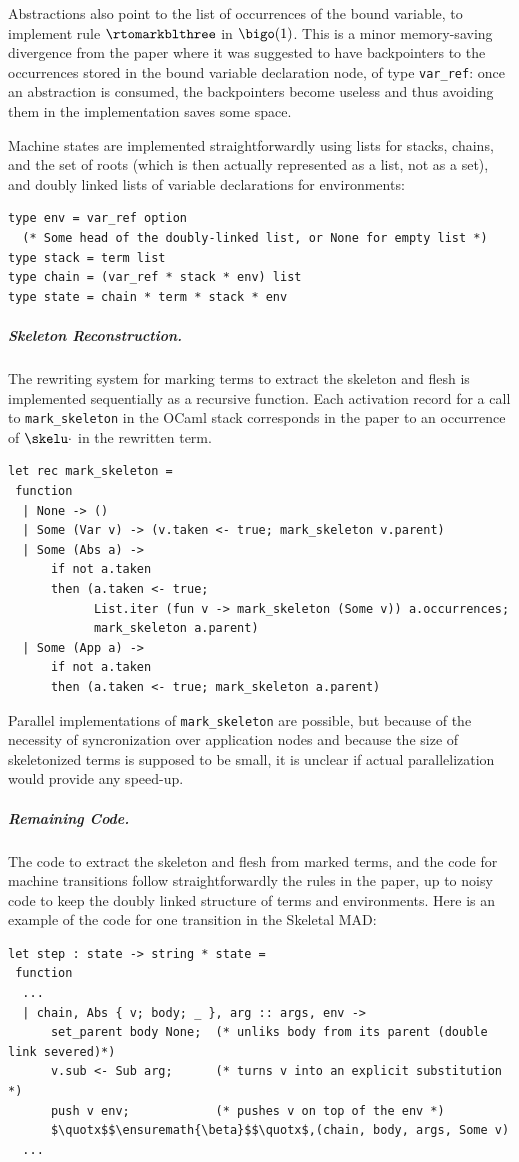 Abstractions also point to the list of occurrences of the bound variable, to implement rule $\rtomarkblthree$ in $\bigo(1)$. This is a minor memory-saving divergence from the paper where it was suggested to have backpointers to the occurrences stored in the bound variable declaration node, of type \lstinline{var_ref}: once an abstraction is consumed, the backpointers become useless and thus avoiding them in the implementation saves some space.

Machine states are implemented straightforwardly using lists for stacks, chains, and the set of roots (which is then actually represented as a list, not as a set), and doubly linked lists of variable declarations for environments:
\begin{lstlisting}
type env = var_ref option
  (* Some head of the doubly-linked list, or None for empty list *)
type stack = term list                                                                                   
type chain = (var_ref * stack * env) list
type state = chain * term * stack * env
\end{lstlisting}


\subparagraph{Skeleton Reconstruction.}
The rewriting system for marking terms to extract the skeleton and flesh is implemented sequentially as a recursive function.
Each activation record for a call to \lstinline{mark_skeleton} in the OCaml stack corresponds
in the paper to an occurrence of $\skelu\cdot$ in the rewritten term.
\begin{lstlisting}
let rec mark_skeleton =
 function
  | None -> ()
  | Some (Var v) -> (v.taken <- true; mark_skeleton v.parent)
  | Some (Abs a) ->
      if not a.taken
      then (a.taken <- true;
            List.iter (fun v -> mark_skeleton (Some v)) a.occurrences;
            mark_skeleton a.parent)
  | Some (App a) ->
      if not a.taken
      then (a.taken <- true; mark_skeleton a.parent)
\end{lstlisting}
Parallel implementations of \lstinline{mark_skeleton} are possible, but because of the necessity of syncronization over application nodes and because the size of skeletonized terms is supposed to be small, it is unclear if actual parallelization would provide any speed-up.

\subparagraph{Remaining Code.}
The code to extract the skeleton and flesh from marked terms, and the code for machine transitions follow
straightforwardly the rules in the paper, up to noisy code to keep the doubly linked structure of terms and environments. Here is an example of the code for one transition in the Skeletal MAD:
\newcommand{\quotx}{"}
\begin{lstlisting}
let step : state -> string * state =
 function
  ...
  | chain, Abs { v; body; _ }, arg :: args, env ->
      set_parent body None;  (* unliks body from its parent (double link severed)*)
      v.sub <- Sub arg;      (* turns v into an explicit substitution *)
      push v env;            (* pushes v on top of the env *)
      $\quotx$$\ensuremath{\beta}$$\quotx$,(chain, body, args, Some v)
  ...
\end{lstlisting}

